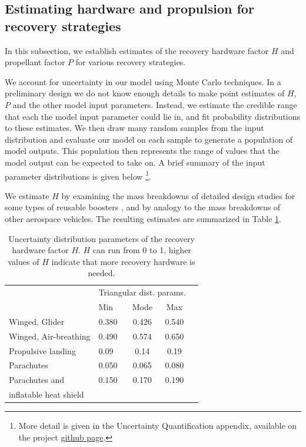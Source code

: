 \documentclass[conf]{new-aiaa}
\begin{document}
\begin{multicols}{2}
\subsection{Estimating hardware and propulsion for recovery strategies}
In this subsection, we establish estimates of the recovery hardware factor $H$ and propellant factor $P$ for various recovery strategies.

We account for uncertainty in our model using Monte Carlo techniques. In a preliminary design we do not know enough details to make point estimates of $H$, $P$ and the other model input parameters. Instead, we estimate the credible range that each the model input parameter could lie in, and fit probability distributions to these estimates. We then draw many random samples from the input distribution and evaluate our model on each sample to generate a population of model outputs. This population then represents the range of values that the model output can be expected to take on. A brief summary of the input parameter distributions is given below \footnote{More detail is given in the Uncertainty Quantification appendix, available on the project \href{https://github.com/mvernacc/lvreuse}{github page}.}.

We estimate $H$ by examining the mass breakdowns of detailed design studies for some types of reusable boosters \cite{Healy1998, Isakowitz2004, Sippel2003, Hellman2005}, and by analogy to the mass breakdowns of other aerospace vehicles. The resulting estimates are summarized in Table \ref{tab:hardware_factor_distributions}.

\begin{table}[H]
    \centering
    \caption{\label{tab:hardware_factor_distributions} Uncertainty distribution parameters of the recovery hardware factor $H$. $H$ can run from 0 to 1, higher values of $H$ indicate that more recovery hardware is needed.}
    \begin{tabular}{l l c c c}
    \hline
     & \multicolumn{3}{c}{Triangular dist. params.} \\
     & Min & Mode & Max \\
    \hline
    \hline
    Winged, Glider  & 0.380 & 0.426 & 0.540 \\
    Winged, Air-breathing & 0.490 & 0.574 & 0.650 \\
    \hline
    Propulsive landing  & 0.09 & 0.14 & 0.19 \\
    \hline
    Parachutes & 0.050 & 0.065 & 0.080 \\
    Parachutes and & 0.150 & 0.170 & 0.190 \\
    \quad inflatable heat shield & & & \\
    \hline
    \end{tabular}
\end{table}


\end{multicols}
\end{document}
